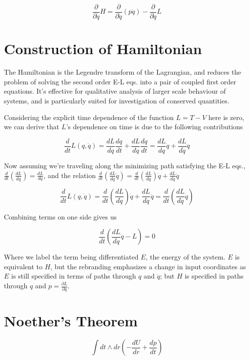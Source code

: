 \documentclass{article}\usepackage[]{graphicx}\usepackage[]{color}
\newcommand{\pd}{\frac{\partial }{\partial \dot{q}}}
\begin{document}
$$
\frac{\partial }{\partial \dot{q}}H=\pd\left( p\dot{q} \right)-\pd L
$$

\section{Construction of Hamiltonian}

The Hamiltonian is the Legendre transform of the Lagrangian, and reduces the problem of solving the second order E-L eqs. into a pair of coupled first order equations. It's effective for qualitative analysis of larger scale behaviour of systems, and is particularly suited for investigation of conserved quantities.



Considering the explicit time dependence of the function 
$L=T-V$ here is zero, we can derive that $L$'s dependence on time is due to the following contributions

$$
\frac{d}{dt}L(q,\dot{q})=
\frac{dL}{dq}\frac{dq}{dt}+
\frac{dL}{d\dot{q}}\frac{d\dot{q}}{dt}=
\frac{dL}{dq}\dot{q}+
\frac{dL}{d\dot{q}}\ddot{q}
$$

Now assuming we're traveling along the minimizing path satisfying the E-L eqs., $\frac{d}{dt}\left( \frac{dL}{d\dot{q}}\right) =\frac{dL}{dq}$, and the relation $\frac{d}{dt}\left( \frac{dL}{d\dot{q}}\dot{q}\right) =\frac{d}{dt}\left( \frac{dL}{d\dot{q}} \right) \dot{q}+\frac{dL}{d\dot{q}}\ddot{q}$

$$
\frac{d}{dt}L(q,\dot{q})=\frac{d}{dt}\left( \frac{dL}{d\dot{q}} \right) \dot{q}+\frac{dL}{d\dot{q}}\ddot{q}=\frac{d}{dt}
\left( \frac{dL}{d\dot{q}}\dot{q}\right)
$$

Combining terms on one side gives us

\begin{equation}
\frac{d}{dt}
\left( \frac{dL}{d\dot{q}}\dot{q}-L\right)=0
\end{equation}

Where we label the term being differentiated $E$, the energy of the system. $E$ is equivalent to $H$, but the rebranding emphasizes a change in input coordinates as $E$ is still specified in terms of paths through $q$ and $\dot{q}$; but $H$ is specified in paths through $q$ and $p=\frac{\partial L}{\partial \dot{q}}$. 


\section{Noether's Theorem}


$$
\int dt\wedge dr \left( 
-\frac{dU}{dr}+\frac{dp}{dt}
 \right)
$$
\end{document}
